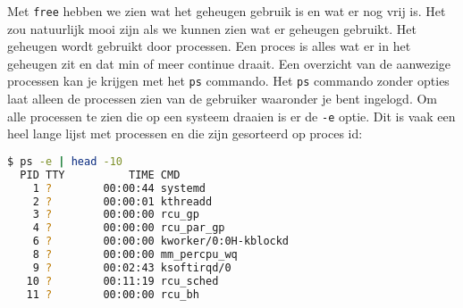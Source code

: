 Met \texttt{free} hebben we zien wat het geheugen gebruik is en wat er nog vrij is. Het zou natuurlijk mooi zijn als we kunnen zien wat er geheugen gebruikt. Het geheugen wordt gebruikt door processen. Een proces is alles wat er in het geheugen zit en dat min of meer continue draait. Een overzicht van de aanwezige processen kan je krijgen met het \texttt{ps} commando. Het \texttt{ps} commando zonder opties laat alleen de processen zien van de gebruiker waaronder je bent ingelogd. Om alle processen te zien die op een systeem draaien is er de \texttt{-e} optie. Dit is vaak een heel lange lijst met processen en die zijn gesorteerd op proces id:
\begin{lstlisting}[language=bash]
$ ps -e | head -10
  PID TTY          TIME CMD
    1 ?        00:00:44 systemd
    2 ?        00:00:01 kthreadd
    3 ?        00:00:00 rcu_gp
    4 ?        00:00:00 rcu_par_gp
    6 ?        00:00:00 kworker/0:0H-kblockd
    8 ?        00:00:00 mm_percpu_wq
    9 ?        00:02:43 ksoftirqd/0
   10 ?        00:11:19 rcu_sched
   11 ?        00:00:00 rcu_bh
\end{lstlisting}

